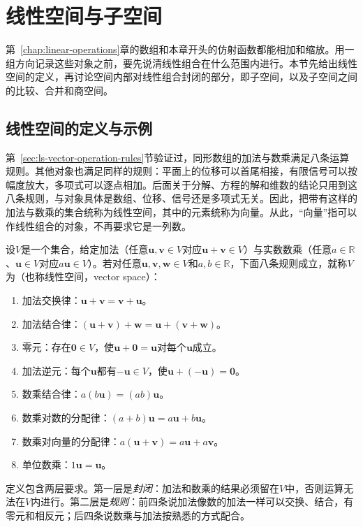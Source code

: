 
\section{线性空间与子空间}
\label{sec:ls-vector-spaces}
\label{sec:linear-algebra-vector-spaces-coordinates}

第~\ref{chap:linear-operations}章的数组和本章开头的仿射函数都能相加和缩放。用一组方向记录这些对象之前，要先说清线性组合在什么范围内进行。本节先给出线性空间的定义，再讨论空间内部对线性组合封闭的部分，即子空间，以及子空间之间的比较、合并和商空间。

\subsection{线性空间的定义与示例}
\label{sec:ls-space-axioms}

第~\ref{sec:ls-vector-operation-rules}节验证过，同形数组的加法与数乘满足八条运算规则。其他对象也满足同样的规则：平面上的位移可以首尾相接，有限信号可以按幅度放大，多项式可以逐点相加。后面关于分解、方程的解和维数的结论只用到这八条规则，与对象具体是数组、位移、信号还是多项式无关。因此，把带有这样的加法与数乘的集合统称为线性空间，其中的元素统称为向量。从此，“向量”指可以作线性组合的对象，不再要求它是一列数。

\begin{definition}[实线性空间]
\label{def:ls-real-vector-space}
设$V$是一个集合，给定加法（任意$\bm u,\bm v\in V$对应$\bm u+\bm v\in V$）与实数数乘（任意$a\in\mathbb R$、$\bm u\in V$对应$a\bm u\in V$）。若对任意$\bm u,\bm v,\bm w\in V$和$a,b\in\mathbb R$，下面八条规则成立，就称$V$为（也称线性空间，vector space）：
\begin{enumerate}
 \item 加法交换律：$\bm u+\bm v=\bm v+\bm u$。
 \item 加法结合律：$(\bm u+\bm v)+\bm w=\bm u+(\bm v+\bm w)$。
 \item 零元：存在$\bm0\in V$，使$\bm u+\bm0=\bm u$对每个$\bm u$成立。
 \item 加法逆元：每个$\bm u$都有$-\bm u\in V$，使$\bm u+(-\bm u)=\bm0$。
 \item 数乘结合律：$a(b\bm u)=(ab)\bm u$。
 \item 数乘对数的分配律：$(a+b)\bm u=a\bm u+b\bm u$。
 \item 数乘对向量的分配律：$a(\bm u+\bm v)=a\bm u+a\bm v$。
 \item 单位数乘：$1\bm u=\bm u$。
\end{enumerate}
\end{definition}
定义包含两层要求。第一层是\emph{封闭}：加法和数乘的结果必须留在$V$中，否则运算无法在$V$内进行。第二层是\emph{规则}：前四条说加法像数的加法一样可以交换、结合，有零元和相反元；后四条说数乘与加法按熟悉的方式配合。

